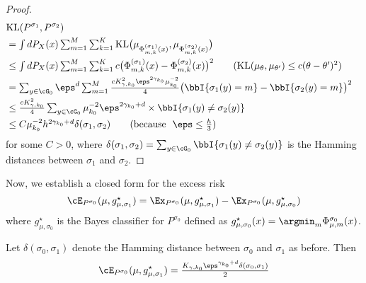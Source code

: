 \begin{proof}
\[
\begin{aligned}
    & \text{KL}(P^{\sigma_1}, P^{\sigma_2}) & \\
    & = \textstyle \int dP_X(x) \sum_{m=1}^M \sum_{k = 1 }^K\text{KL}\big(\mu_{\Phi_{m, k}^{(\sigma_1)}(x)} , \mu_{\Phi_{m,k}^{(\sigma_2)}(x)} \big)  & \\
    & \le \textstyle \int dP_X(x) \sum_{m=1}^M \sum_{k = 1 }^Kc\big({\Phi_{m, k}^{(\sigma_1)}(x)} - {\Phi_{m,k}^{(\sigma_2)}(x)} \big)^2 \quad \quad (\text{KL}(\mu_\theta, \mu_{\theta'})  \le c  (\theta - \theta')^2)\\
    & = \textstyle \sum_{y \in \cG_0 } \eps^d\sum_{m=1}^M  \frac{cK_{\gamma, k_0}^2\eps^{2\gamma_{k_0}}\mu_{k_0}^{-2} }{4}\big(\bbI\{\sigma_1(y) = m\}  - \bbI\{\sigma_2(y) = m\} \big)^2\\
    & \le \textstyle \frac{c K_{\gamma, k_0}^2 }{4}\sum_{y \in \cG_0 }  \mu_{k_0}^{-2} \eps ^{2\gamma_{k_0} + d }\times \bbI\{\sigma_1(y) \neq \sigma_2(y) \}  \\
    & \textstyle \le   C \mu_{k_0}^{-2} h ^{2\gamma_{k_0} + d }\delta(\sigma_1 , \sigma_2) \quad \quad  \textstyle (\text{because} ~~\eps \le \frac{h}{3})
\end{aligned}
\] for some $C>0$, where $\delta(\sigma_1, \sigma_2) = \sum_{y \in \cG_0 }   \bbI\{\sigma_1(y) \neq \sigma_2(y) \} $ is the Hamming distances between $\sigma_1$ and $\sigma_2$. 
\end{proof}
Now, we establish a closed form for the excess risk 
\[
\textstyle \cE_{P^{\sigma_0}}(\mu, g^\star_{\mu, \sigma_1}) = \Ex_{P^{\sigma_0}}(\mu, g^\star_{\mu, \sigma_1}) - \Ex_{P^{\sigma_0}}(\mu, g^\star_{\mu, \sigma_0})
\]
where $g^\star_{\mu, \sigma_0}$ is the Bayes classifier for $P^{\sigma_0}$ defined as $g^\star_{\mu, \sigma_0}(x) = \argmin_m \Phi_{\mu, m}^{\sigma_0}(x)$. 
\begin{lemma}
    Let $\delta(\sigma_0, \sigma_1)$ denote the Hamming distance between $\sigma_0$ and $\sigma_1$ as before. Then
    \[\cE_{P^{\sigma_0}}(\mu, g^\star_{\mu, \sigma_1}) = \textstyle \frac{ K_{\gamma, k_0} \eps^{\gamma_{k_0} + d} \delta(\sigma_0, \sigma_1)}{2} \]
\end{lemma}
